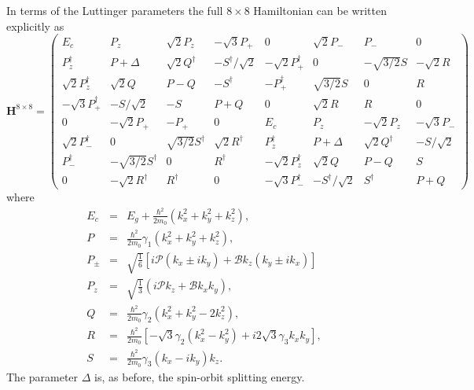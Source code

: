 In terms of the Luttinger parameters the full $8\times8$ Hamiltonian
can be written explicitly as \citet{Chuang1995,Luttinger1956,Kohn1955a}\begin{equation}
\mathbf{H}^{8\times8}=\left(\begin{array}{cccccccc}
E_{c} & P_{z} & \sqrt{2}P_{z} & -\sqrt{3}P_{+} & 0 & \sqrt{2}P_{-} & P_{-} & 0\\
P_{z}^{\dagger} & P+\Delta & \sqrt{2}Q^{\dagger} & -S^{\dagger}/\sqrt{2} & -\sqrt{2}P_{+}^{\dagger} & 0 & -\sqrt{3/2}S & -\sqrt{2}R\\
\sqrt{2}P_{z}^{\dagger} & \sqrt{2}Q & P-Q & -S^{\dagger} & -P_{+}^{\dagger} & \sqrt{3/2}S & 0 & R\\
-\sqrt{3}P_{+}^{\dagger} & -S/\sqrt{2} & -S & P+Q & 0 & \sqrt{2}R & R & 0\\
0 & -\sqrt{2}P_{+} & -P_{+} & 0 & E_{c} & P_{z} & -\sqrt{2}P_{z} & -\sqrt{3}P_{-}\\
\sqrt{2}P_{-}^{\dagger} & 0 & \sqrt{3/2}S^{\dagger} & \sqrt{2}R^{\dagger} & P_{z}^{\dagger} & P+\Delta & \sqrt{2}Q^{\dagger} & -S/\sqrt{2}\\
P_{-}^{\dagger} & -\sqrt{3/2}S^{\dagger} & 0 & R^{\dagger} & -\sqrt{2}P_{z}^{\dagger} & \sqrt{2}Q & P-Q & S\\
0 & -\sqrt{2}R^{\dagger} & R^{\dagger} & 0 & -\sqrt{3}P_{-}^{\dagger} & -S^{\dagger}/\sqrt{2} & S^{\dagger} & P+Q\end{array}\right)\end{equation}
where \begin{eqnarray}
E_{c} & = & E_{g}+\frac{\hbar^{2}}{2m_{0}}\left(k_{x}^{2}+k_{y}^{2}+k_{z}^{2}\right),\\
P & = & \frac{\hbar^{2}}{2m_{0}}\gamma_{1}\left(k_{x}^{2}+k_{y}^{2}+k_{z}^{2}\right),\\
P_{\pm} & = & \sqrt{\frac{1}{6}}\left[i\mathcal{P}\left(k_{x}\pm ik_{y}\right)+\mathcal{B}k_{z}\left(k_{y}\pm ik_{x}\right)\right]\\
P_{z} & = & \sqrt{\frac{1}{3}}\left(i\mathcal{P}k_{z}+\mathcal{B}k_{x}k_{y}\right),\\
Q & = & \frac{\hbar^{2}}{2m_{0}}\gamma_{2}\left(k_{x}^{2}+k_{y}^{2}-2k_{z}^{2}\right),\\
R & = & \frac{\hbar^{2}}{2m_{0}}\left[-\sqrt{3}\gamma_{2}\left(k_{x}^{2}-k_{y}^{2}\right)+i2\sqrt{3}\gamma_{3}k_{x}k_{y}\right],\\
S & = & \frac{\hbar^{2}}{2m_{0}}\gamma_{3}\left(k_{x}-ik_{y}\right)k_{z}.\end{eqnarray}
The parameter $\Delta$ is, as before, the spin-orbit splitting energy.
